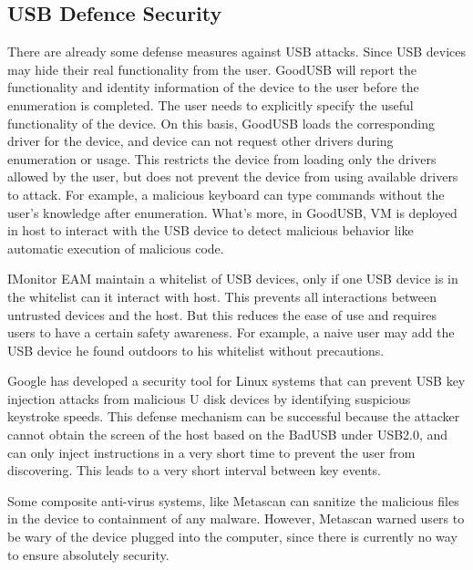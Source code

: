 \subsection{USB Defence Security}

There are already some defense measures against USB attacks. Since USB devices may hide their real functionality from the user. GoodUSB\cite{tian2015defending} will report the functionality and identity information of the device to the user before the enumeration is completed. The user needs to explicitly specify the useful functionality of the device. On this basis, GoodUSB loads the corresponding driver for the device, and device can not request other drivers during enumeration or usage. This restricts the device from loading only the drivers allowed by the user, but does not prevent the device from using available drivers to attack. For example, a malicious keyboard can type commands without the user's knowledge after enumeration. What's more, in GoodUSB, VM is deployed in host to interact with the USB device to detect malicious behavior like automatic execution of malicious code.
 
IMonitor EAM\cite{IMonitor} maintain a whitelist of USB devices, only if one USB device is in the whitelist can it interact with host. This prevents all interactions between untrusted devices and the host. But this reduces the ease of use and requires users to have a certain safety awareness. For example, a naive user may add the USB device he found outdoors to his whitelist without precautions.

Google\cite{Googleukip} has developed a security tool for Linux systems that can prevent USB key injection attacks from malicious U disk devices by identifying suspicious keystroke speeds. This defense mechanism can be successful because the attacker cannot obtain the screen of the host based on the BadUSB under USB2.0, and can only inject instructions in a very short time to prevent the user from discovering. This leads to a very short interval between key events.

Some composite anti-virus systems, like Metascan\cite{OPSWAT} can sanitize the malicious files in the device to containment of any malware. However, Metascan warned users to be wary of the device plugged into the computer, since there is currently no way to ensure absolutely security.


